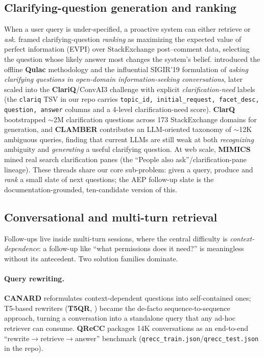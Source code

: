 \subsection{Clarifying-question generation and ranking}

When a user query is under-specified, a proactive system can either retrieve or
\emph{ask}. \citet{fu:rao2018clarification} framed clarifying-question
\emph{ranking} as maximizing the expected value of perfect information (EVPI)
over StackExchange post--comment data, selecting the question whose likely
answer most changes the system's belief.
\citet{fu:aliannejadi2019clarifying} introduced the offline
\textbf{Qulac} methodology and the influential SIGIR'19 formulation of
\emph{asking clarifying questions in open-domain information-seeking
conversations}, later scaled into the \textbf{ClariQ}/ConvAI3 challenge
\citep{fu:aliannejadi2021convai3} with explicit \emph{clarification-need}
labels (the \texttt{clariq} TSV in our repo carries
\texttt{topic\_id, initial\_request, facet\_desc, question, answer} columns and
a 4-level clarification-need score).
\textbf{ClarQ} \citep{fu:kumar2020clarq} bootstrapped $\sim$2M
clarification questions across 173 StackExchange domains for generation, and
\textbf{CLAMBER} \citep{fu:clamber2024} contributes an LLM-oriented taxonomy of
$\sim$12K ambiguous queries, finding that current LLMs are still weak at both
\emph{recognizing} ambiguity and \emph{generating} a useful clarifying question.
At web scale, \textbf{MIMICS} \citep{fu:zamani2020mimics} mined real search
clarification panes (the ``People also ask''/clarification-pane lineage). These
threads share our core sub-problem: given a query, produce and \emph{rank} a
small slate of next questions; the AEP follow-up slate is the
documentation-grounded, ten-candidate version of this.

\subsection{Conversational and multi-turn retrieval}

Follow-ups live inside multi-turn sessions, where the central difficulty is
\emph{context-dependence}: a follow-up like ``what permissions does it need?''
is meaningless without its antecedent. Two solution families dominate.
\paragraph{Query rewriting.} \textbf{CANARD} \citep{fu:elgohary2019canard}
reformulates context-dependent questions into self-contained ones; T5-based
rewriters (\textbf{T5QR}, \citealp{fu:lin2020t5qr}) became the de-facto
sequence-to-sequence approach, turning a conversation into a standalone query
that any ad-hoc retriever can consume. \textbf{QReCC}
\citep{fu:anantha2021qrecc} packages 14K conversations as an end-to-end
``rewrite$\rightarrow$retrieve$\rightarrow$answer'' benchmark
(\texttt{qrecc\_train.json}/\texttt{qrecc\_test.json} in the repo).

